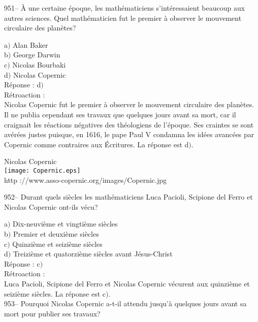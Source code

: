 ﻿\documentclass[letterpaper, 12pt]{article}
\begin{document}
951-- \`A une certaine \'epoque, les math\'ematiciens
s'int\'eressaient beaucoup aux autres sciences. Quel math\'ematicien
fut le premier \`a observer le mouvement circulaire des plan\`etes?

a$)$ Alan Baker \\
b$)$ George Darwin \\
c$)$ Nicolas Bourbaki  \\
d$)$ Nicolas Copernic \\

R\'eponse : d$)$\\

R\'etroaction : \\
Nicolas Copernic fut le premier \`a observer le mouvement circulaire
des plan\`etes. Il ne publia cependant ses travaux que quelques
jours avant sa mort, car il craignait les r\'eactions n\'egatives
des th\'eologiens de l'\'epoque. Ses craintes se sont av\'er\'ees
justes puisque, en 1616, le pape Paul V condamna les id\'ees
avanc\'ees par Copernic comme \og contraires aux
\'Ecritures\fg . La r\'eponse est d$)$.\\

        \begin{center}
        Nicolas Copernic\\
    \texttt{[image: Copernic.eps]}\\
        {\footnotesize http ://www.asso-copernic.org/images/Copernic.jpg}
    \end{center}

952-- Durant quels si\`ecles les math\'ematiciens Luca Pacioli,
Scipione del Ferro et Nicolas Copernic ont-ils v\'ecu?

a$)$ Dix-neuvi\`eme et vingti\`eme si\`ecles \\
b$)$ Premier et deuxi\`eme si\`ecles \\
c$)$ Quinzi\`eme et seizi\`eme si\`ecles  \\
d$)$ Treizi\`eme et quatorzi\`eme si\`ecles avant J\'esus-Christ\\

R\'eponse : c$)$\\

R\'etroaction : \\
Luca Pacioli, Scipione del Ferro et Nicolas Copernic v\'ecurent aux
quinzi\`eme et seizi\`eme si\`ecles. La r\'eponse est c$)$.\\

953-- Pourquoi Nicolas Copernic a-t-il attendu jusqu'\`a quelques
jours avant sa mort pour publier ses travaux?
\end{document}
